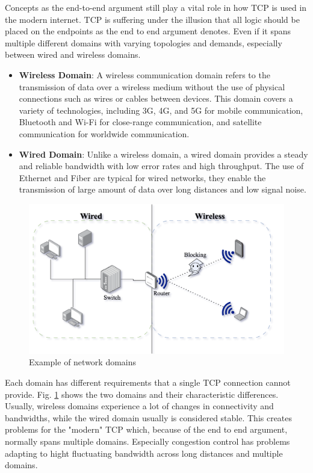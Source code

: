 \documentclass[a4paper,english, 11pt]{report}
\begin{document}
Concepts as the end-to-end argument still play a vital role in how TCP is used in the modern internet. TCP is suffering under the illusion that all logic should be placed on the endpoints as the end to end argument denotes. Even if it spans multiple different domains with varying topologies and demands, especially between wired and wireless domains.
\begin{itemize}
  \item \textbf{Wireless Domain}: A wireless communication domain refers to the transmission of data over a wireless medium without the use of physical connections such as wires or cables between devices. This domain covers a variety of technologies, including 3G, 4G, and 5G for mobile communication, Bluetooth and Wi-Fi for close-range communication, and satellite communication for worldwide communication.
  \item \textbf{Wired Domain}: Unlike a wireless domain, a wired domain provides a steady and reliable bandwidth with low error rates and high throughput. The use of Ethernet and Fiber are typical for wired networks, they enable the transmission of large amount of data over long distances and low signal noise. 
\end{itemize}

\begin{figure}[h] %
	\centering
	\includegraphics[scale=0.65]{../diagrams/drawio/domains.png}
  	\caption{Example of network domains}
  	\label{fig:domains}
\end{figure}

Each domain has different requirements that a single TCP connection cannot provide. Fig. \ref{fig:domains} shows the two domains and their characteristic differences. Usually, wireless domains experience a lot of changes in connectivity and bandwidths, while the wired domain usually is considered stable. This creates problems for the "modern" TCP which, because of the end to end argument, normally spans multiple domains. Especially congestion control has problems adapting to hight fluctuating bandwidth across long distances and multiple domains.
\end{document}
